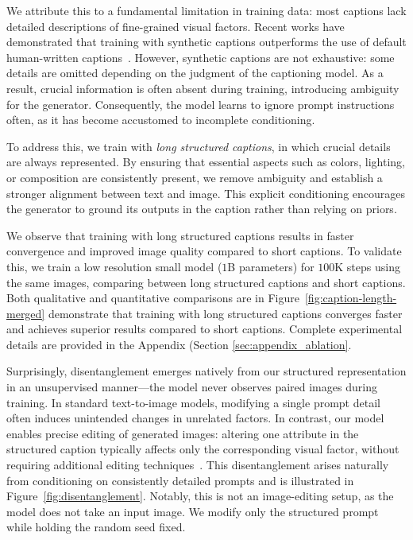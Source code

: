 



We attribute this to a fundamental limitation in training data: most captions lack detailed descriptions of fine-grained visual factors. Recent works have demonstrated that training with synthetic captions outperforms the use of default human-written captions~\cite{esser2024scaling, liu2024playground}.
However, synthetic captions are not exhaustive: some details are omitted depending on the judgment of the captioning model. As a result, crucial information is often absent during training, introducing ambiguity for the generator. Consequently, the model learns to ignore prompt instructions often, as it has become accustomed to incomplete conditioning.  



To address this, we train with \textit{long structured captions}, in which crucial details are always represented. By ensuring that essential aspects such as colors, lighting, or composition are consistently present, we remove ambiguity and establish a stronger alignment between text and image. This explicit conditioning encourages the generator to ground its outputs in the caption rather than relying on priors.  


We observe that training with long structured captions results in faster convergence and improved image quality compared to short captions. To validate this, we train a low resolution small model ($1$B parameters) for $100$K steps using the same images, comparing between long structured captions and short captions. Both qualitative and quantitative comparisons are in Figure~\ref{fig:caption-length-merged} demonstrate that training with long structured captions converges faster and achieves superior results compared to short captions. Complete experimental details are provided in the Appendix (Section \ref{sec:appendix_ablation}.



% 




Surprisingly, disentanglement emerges natively from our structured representation in an unsupervised manner—the model never observes paired images during training. In standard text-to-image models, modifying a single prompt detail often induces unintended changes in unrelated factors. In contrast, our model enables precise editing of generated images: altering one attribute in the structured caption typically affects only the corresponding visual factor, without requiring additional editing techniques~\cite{hertz2022prompt,mokady2023null}. This disentanglement arises naturally from conditioning on consistently detailed prompts and is illustrated in Figure~\ref{fig:disentanglement}. Notably, this is not an image-editing setup, as the model does not take an input image. We modify only the structured prompt while holding the random seed fixed.




